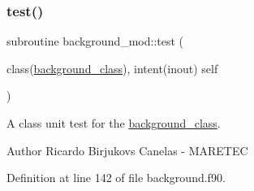 \subsubsection{\texorpdfstring{test()}{test()}}
{\footnotesize\ttfamily subroutine background\+\_\+mod\+::test (\begin{DoxyParamCaption}\item[{class(\mbox{\hyperlink{structbackground__mod_1_1background__class}{background\+\_\+class}}), intent(inout)}]{self }\end{DoxyParamCaption})\hspace{0.3cm}{\ttfamily [private]}}



A class \textquotesingle{}unit\textquotesingle{} test for the \mbox{\hyperlink{structbackground__mod_1_1background__class}{background\+\_\+class}}. 

\begin{DoxyAuthor}{Author}
Ricardo Birjukovs Canelas -\/ M\+A\+R\+E\+T\+EC 
\end{DoxyAuthor}


Definition at line 142 of file background.\+f90.


